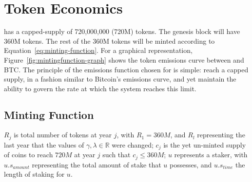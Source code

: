 \documentclass[runningheads]{llncs}
\begin{document}
\section{Token Economics}

\AVATokenName{} has a capped-supply of 720,000,000 (720M) tokens. The genesis block will have 360M \AVATokenName{} tokens. The rest of the  360M tokens will be minted according to Equation~\ref{eq:minting-function}. For a graphical representation, Figure~\ref{fig:mintingfunction-graph} shows the token emissions curve between \AVATokenName{} and BTC. The principle of the emissions function chosen for \AVAPlatformName{} is simple: reach a capped supply, in a fashion similar to Bitcoin's emissions curve, and yet maintain the ability to govern the rate at which the system reaches this limit.

\subsection{Minting Function}

$R_j$ is total number of tokens at year $j$, with $R_1 = 360M$, and $R_l$ representing the last year that the values of $\gamma, \lambda \in \mathbb{R}$ were changed; $c_j$ is the yet un-minted supply of coins to reach $720M$ at year $j$ such that $c_j \leq 360M$; $u$ represents a staker, with $u.s_{amount}$ representing the total amount of stake that $u$ possesses, and $u.s_{time}$ the length of staking for $u$.
\end{document}
